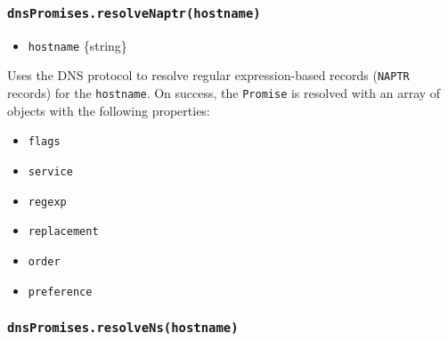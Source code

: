 \subsubsection{\texorpdfstring{\texttt{dnsPromises.resolveNaptr(hostname)}}{dnsPromises.resolveNaptr(hostname)}}\label{dnspromises.resolvenaptrhostname}

\begin{itemize}
\tightlist
\item
  \texttt{hostname} \{string\}
\end{itemize}

Uses the DNS protocol to resolve regular expression-based records
(\texttt{NAPTR} records) for the \texttt{hostname}. On success, the
\texttt{Promise} is resolved with an array of objects with the following
properties:

\begin{itemize}
\tightlist
\item
  \texttt{flags}
\item
  \texttt{service}
\item
  \texttt{regexp}
\item
  \texttt{replacement}
\item
  \texttt{order}
\item
  \texttt{preference}
\end{itemize}

\begin{Shaded}
\begin{Highlighting}[]
\NormalTok{\{}
  \OperatorTok{:} \OperatorTok{,}
  \OperatorTok{:} \OperatorTok{,}
  \OperatorTok{:} \StringTok{\textquotesingle{}\textquotesingle{}}\OperatorTok{,}
  \OperatorTok{:} \OperatorTok{,}
  \OperatorTok{:} \OperatorTok{,}
  \OperatorTok{:} 
\NormalTok{\}}
\end{Highlighting}
\end{Shaded}

\subsubsection{\texorpdfstring{\texttt{dnsPromises.resolveNs(hostname)}}{dnsPromises.resolveNs(hostname)}}\label{dnspromises.resolvenshostname}

